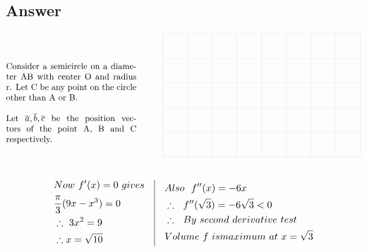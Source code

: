 \documentclass[14pt]{extarticle}
\begin{document}
\begin{fleqn}
\subsection*{Answer}
\begin{equation} \nonumber
\begin{alignedat}{4}
\begin{minipage}{15em}
  Consider a semicircle on a diameter AB with center O and radius r. Let C be any point on the circle other than A or B. \\ \\Let $\overline{a}, \overline{b}, \overline{c}$ be the position vectors of the point A, B and C respectively.
  \end{minipage}
\end{alignedat}
\quad\quad\quad
\begin{alignedat}{4}
\begin{tikzpicture}
\draw[very thin, gray!40, step=1 cm](0,0) grid (8,5);\end{tikzpicture}\\\
\end{alignedat}
\end{equation}
\begin{equation} \nonumber
\begin{alignedat}{4}
& Now\ f'(x) = 0\ gives\\
& \frac{\pi}{3}(9x - x^3)=0\\
& \therefore \ 3x^2=9\\
& \therefore x = \sqrt{10}
\end{alignedat}
\quad
\vrule
\quad
\begin{alignedat}{4}
& Also\ \ f''(x) =-6x\\
& \therefore\ \ f''(\sqrt{3})=-6\sqrt{3}<0\\
& \therefore \ \ By\ second\ derivative\ test\\
& Volume \ f\ is maximum\ at\ x=\sqrt{3}
\end{alignedat}
\end{equation}


\end{fleqn}
\end{document}

